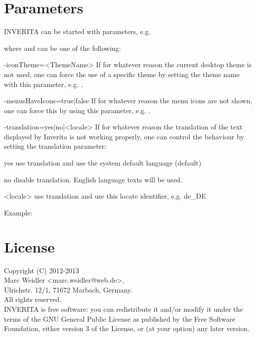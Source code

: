\section{Parameters}
INVERITA can be started with parameters, e.g.
where  and  can be one of the following:
\begin{attributes}
 \item[-iconTheme=<ThemeName>]
    If for whatever reason the current desktop theme is not used, one can force the
    use of a specific theme by setting the theme name with this parameter, e.g.
    .

  \item[-menusHaveIcons=true|false]
    If for whatever reason the menu icons are not shown, one can force this by using
    this parameter, e.g. .

  \item[-translation=yes|no|<locale>]
    If for whatever reason the translation of the text displayed by Inverita is not
    working properly, one can control the behaviour by setting the translation
    parameter:
    \begin{attributes}[50pt]
       \item[yes]    use translation and use the system default language (default)
       \item[no]     disable translation. English language texts will be used.
       \item[<locale>] use translation and use this locate identifier, e.g. de\_DE
    \end{attributes}
    Example: 
\end{attributes}


\section{License}
Copyright (C) 2012-2013\\
Marc Weidler <marc.weidler@web.de>,\\
Ulrichstr. 12/1, 71672 Marbach, Germany.\\
All rights reserved.\\

INVERITA is free software: you can redistribute it and/or modify
it under the terms of the GNU General Public License as published by
the Free Software Foundation, either version 3 of the License, or
(at your option) any later version.

